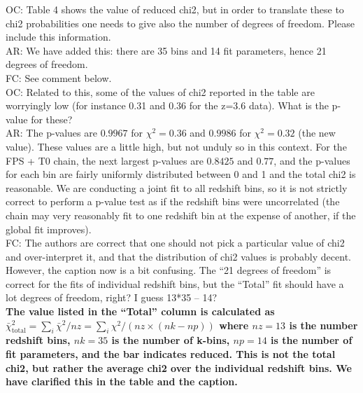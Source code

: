 \documentclass[12pt]{article}
\begin{document}
OC: Table 4 shows the value of reduced chi2, but in order to translate these to chi2 probabilities one needs to give also the number of degrees of freedom. Please include this information.\\

AR: We have added this: there are 35 bins and 14 fit parameters, hence 21 degrees of freedom.\\

FC: See comment below.\\


OC: Related to this, some of the values of chi2 reported in the table are worryingly low (for instance 0.31 and 0.36 for the z=3.6 data). What is the p-value for these?\\

AR: The p-values are $0.9967$ for $\chi^2 = 0.36$ and $0.9986$ for $\chi^2 = 0.32$ (the new value). These values are a little high, but not unduly so in this context. For the FPS + T0 chain, the next largest p-values are $0.8425$ and $0.77$, and the p-values for each bin are fairly uniformly distributed between 0 and 1 and the total chi2 is reasonable. We are conducting a joint fit to all redshift bins, so it is not strictly correct to perform a p-value test as if the redshift bins were uncorrelated (the chain may very reasonably fit to one redshift bin at the expense of another, if the global fit improves).\\

FC: The authors are correct that one should not pick a particular value of chi2 and over-interpret it, and that the distribution of chi2 values is probably decent. However, the caption now is a bit confusing. The “21 degrees of freedom” is correct for the fits of individual redshift bins, but the “Total” fit should have a lot degrees of freedom, right? I guess 13*35 – 14?\\

\textbf{The value listed in the ``Total'' column is calculated as $\bar{\chi}^2_{\text{total}} = \sum_i \bar{\chi}^2 / nz = \sum_i \chi^2 /(nz \times (nk - np))$ where $nz = 13$ is the number redshift bins, $nk=35$ is the number of k-bins, $np=14$ is the number of fit parameters, and the bar indicates reduced. This is not the total chi2, but rather the average chi2 over the individual redshift bins. We have clarified this in the table and the caption.}\\
\end{document}
